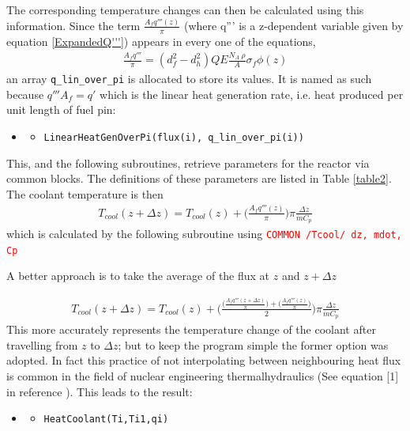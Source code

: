\documentclass[a4paper, 12pt]{article}
\begin{document}
The corresponding temperature changes can then be calculated using this information.
Since the term $\frac{A_f q'''(z)}{\pi}$ (where q''' is a z-dependent variable given by equation \ref{ExpandedQ'''}) appears in every one of the equations,
\begin{align}
\frac{A_f q'''}{\pi} = (d_f^2-d_h^2) Q E \frac{N_A \:\rho}{A} \sigma_f \phi(z) \label{Afq'''pi}
\end{align}
an array \texttt{q\_lin\_over\_pi} is allocated to store its values. It is named as such because $q''' A_f = q'$ which is the linear heat generation rate, i.e. heat produced per unit length of fuel pin:
\begin{itemize}
	\item[]
	\begin{itemize}
	\item \texttt{\textcolor{subr}{LinearHeatGenOverPi}(flux(i), q\_lin\_over\_pi(i))}
	\end  {itemize}
\end  {itemize}
This, and the following subroutines, retrieve parameters for the reactor via common blocks. The definitions of these parameters are listed in Table \ref{table2}.\\

The coolant temperature is then 
\begin{align}\label{Tcool}
T_{cool}(z+\Delta z)= T_{cool}(z)+ \bigg(\frac{A_f q'''(z)}{\pi}\bigg) \pi \frac{\Delta z}{\dot{m}C_p}
\end{align}
which is calculated by the following subroutine using \texttt{\textcolor{red}{COMMON /Tcool/ dz, mdot, Cp}}

A better approach is to take the average of the flux at $z$ and $z+\Delta z$
	
\begin{align}
T_{cool}(z+\Delta z)= T_{cool}(z)+ \bigg(\frac{\big(\frac{A_f q'''(z+\Delta z)}{\pi}\big)+\big(\frac{A_f q'''(z)}{\pi}\big)}{2}\bigg) \pi \frac{\Delta z}{\dot{m}C_p}
\label{LinearInterp}
\end{align}
This more accurately represents the temperature change of the coolant after travelling from $z$ to $\Delta z$; but to keep the program simple the former option was adopted. In fact this practice of not interpolating between neighbouring heat flux is common in the field of nuclear engineering thermalhydraulics (See equation [1] in reference \cite{S.Carli} ). This leads to the result:

\begin{itemize}
	\item[]
	\begin{itemize}
	\item \texttt{\textcolor{subr}{HeatCoolant}(Ti,Ti1,qi)}
	\end{itemize}
\end{itemize}
\end{document}
